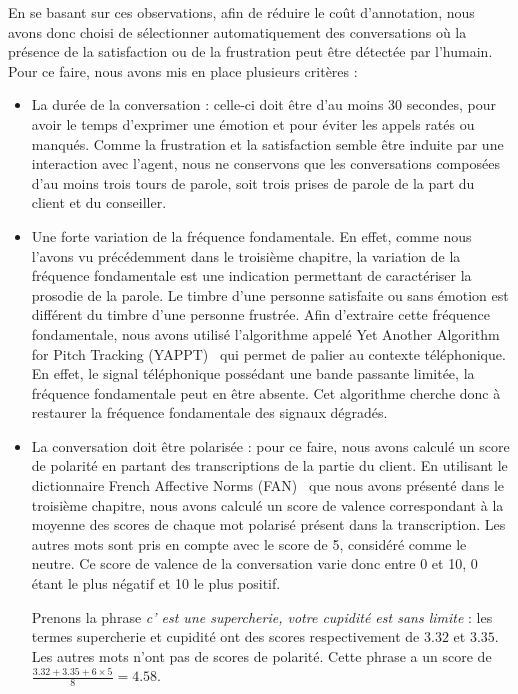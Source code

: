 En se basant sur ces observations, afin de réduire le coût d'annotation, nous avons donc choisi de sélectionner automatiquement des conversations où la présence de la satisfaction ou de la frustration peut être détectée par l'humain. Pour ce faire, nous avons mis en place plusieurs critères :
\begin{itemize}
  \item La durée de la conversation : celle-ci doit être d'au moins 30 secondes, pour avoir le temps d'exprimer une émotion et pour éviter les appels ratés ou manqués. Comme la frustration et la satisfaction semble être induite par une interaction avec l'agent, nous ne conservons que les conversations composées d'au moins trois tours de parole, soit trois prises de parole de la part du client et du conseiller.
  \item Une forte variation de la fréquence fondamentale. En effet, comme nous l'avons vu précédemment dans le troisième chapitre, la variation de la fréquence fondamentale est une indication permettant de caractériser la prosodie de la parole. Le timbre d'une personne satisfaite ou sans émotion est différent du timbre d'une personne frustrée. Afin d'extraire cette fréquence fondamentale, nous avons utilisé l'algorithme appelé Yet Another Algorithm for Pitch Tracking (YAPPT)~\cite{Zahorian2008} qui permet de palier au contexte téléphonique. En effet, le signal téléphonique possédant une bande passante limitée, la fréquence fondamentale peut en être absente. Cet algorithme cherche donc à restaurer la fréquence fondamentale des signaux dégradés.
  \item La conversation doit être polarisée : pour ce faire, nous avons calculé un score de polarité en partant des transcriptions de la partie du client. En utilisant le dictionnaire French Affective Norms (FAN)~\cite{Monnier2014} que nous avons présenté dans le troisième chapitre, nous avons calculé un score de valence correspondant à la moyenne des scores de chaque mot polarisé présent dans la transcription. Les autres mots sont pris en compte avec le score de 5, considéré comme le neutre. Ce score de valence de la conversation varie donc entre 0 et 10, 0 étant le plus négatif et 10 le plus positif.

  Prenons la phrase \textit{c' est une supercherie, votre cupidité est sans limite} : les termes supercherie et cupidité ont des scores respectivement de $3.32$ et $3.35$. Les autres mots n'ont pas de scores de polarité. Cette phrase a un score de $\frac{3.32+3.35+6\times5}{8}=4.58$.
\end{itemize}

